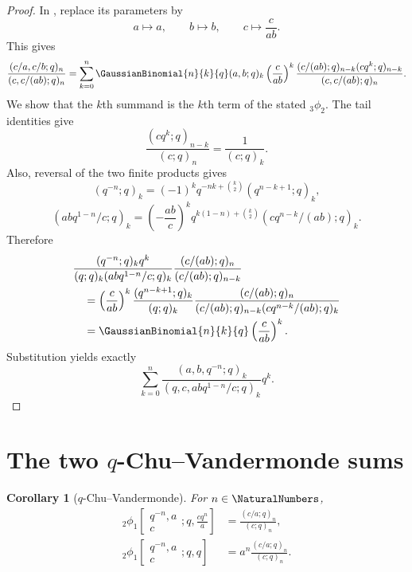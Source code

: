 \documentclass[11pt,a4paper,oneside,openany]{book}
\newtheorem{corollary}[corollary]{Corollary}
\theoremstyle{definition}
\theoremstyle{remark}
\begin{document}
\begin{proof}
In , replace its parameters by
\[
 a\mapsto a,\qquad b\mapsto b,\qquad c\mapsto \frac{c}{ab}.
\]
This gives
\[
 \frac{(c/a,c/b;q)_n}{(c,c/(ab);q)_n}
 =\sum_{k=0}^{n}\GaussianBinomial{n}{k}{q}(a,b;q)_k
 \left(\frac{c}{ab}\right)^k
 \frac{(c/(ab);q)_{n-k}(cq^k;q)_{n-k}}
 {(c,c/(ab);q)_n}.
\]
We show that the $k$th summand is the $k$th term of the stated ${}_3\phi_2$.  The tail identities give
\[
 \frac{(cq^k;q)_{n-k}}{(c;q)_n}=\frac1{(c;q)_k}.
\]
Also, reversal of the two finite products gives
\[
 (q^{-n};q)_k
 =(-1)^kq^{-nk+\binom k2}(q^{n-k+1};q)_k,
\]
\[
 (abq^{1-n}/c;q)_k
 =\left(-\frac{ab}{c}\right)^k
 q^{k(1-n)+\binom k2}
 (cq^{n-k}/(ab);q)_k.
\]
Therefore
\begin{align*}
 &\frac{(q^{-n};q)_k q^k}{(q;q)_k(abq^{1-n}/c;q)_k}
 \frac{(c/(ab);q)_n}{(c/(ab);q)_{n-k}}\\
 &\quad=\left(\frac{c}{ab}\right)^k
 \frac{(q^{n-k+1};q)_k}{(q;q)_k}
 \frac{(c/(ab);q)_n}
 {(c/(ab);q)_{n-k}(cq^{n-k}/(ab);q)_k}\\
 &\quad=\GaussianBinomial{n}{k}{q}\left(\frac{c}{ab}\right)^k.
\end{align*}
Substitution yields exactly
\[
 \sum_{k=0}^{n}
 \frac{(a,b,q^{-n};q)_k}{(q,c,abq^{1-n}/c;q)_k}q^k.
\]
\end{proof}

\section{The two \texorpdfstring{$q$}{q}-Chu--Vandermonde sums}

\begin{corollary}[$q$-Chu--Vandermonde]\label{cor:q-chu}
For $n\in\NaturalNumbers$,
\begin{align}
 {}_2\phi_1\!\left[
 \begin{matrix}q^{-n},a\\c\end{matrix};q,\frac{cq^n}{a}\right]
 &=\frac{(c/a;q)_n}{(c;q)_n},\label{eq:qchu1}\\
 {}_2\phi_1\!\left[
 \begin{matrix}q^{-n},a\\c\end{matrix};q,q\right]
 &=a^n\frac{(c/a;q)_n}{(c;q)_n}.
 \label{eq:qchu2}
\end{align}
\end{corollary}
\end{document}
